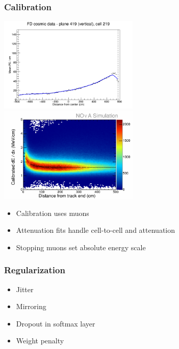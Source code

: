 \documentclass[10pt,professionalfonts,xcolor=table]{beamer}
\begin{document}
\begin{frame}
\frametitle{Calibration}
\includegraphics[width=0.5\textwidth]{figures/plots/reco/calib_totfit_data_inX_419_219}
\includegraphics[width=0.5\textwidth]{figures/plots/reco/calib_dEdX.png}

\begin{itemize}
\item Calibration uses muons
\item Attenuation fits handle cell-to-cell and attenuation
\item Stopping muons set absolute energy scale
\end{itemize}
\end{frame}


\begin{frame}
\frametitle{Regularization}

\begin{itemize}
\item Jitter
\gap
\item Mirroring
\gap
\item Dropout in softmax layer
\gap
\item Weight penalty

\end{itemize}
\end{frame}
\end{document}
